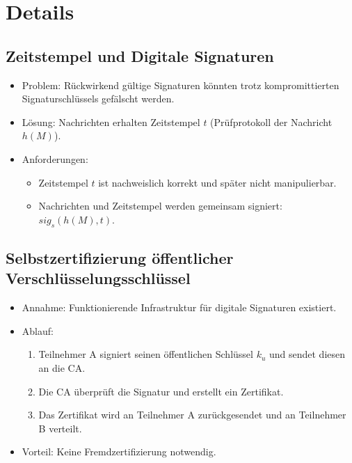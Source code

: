 \documentclass{article}
\begin{document}


\section{Details}

\subsection{Zeitstempel und Digitale Signaturen}
\begin{itemize}
    \item Problem: Rückwirkend gültige Signaturen könnten trotz kompromittierten Signaturschlüssels gefälscht werden.
    \item Lösung: Nachrichten erhalten Zeitstempel $t$ (Prüfprotokoll der Nachricht $h(M)$).
    \item Anforderungen:
    \begin{itemize}
        \item Zeitstempel $t$ ist nachweislich korrekt und später nicht manipulierbar.
        \item Nachrichten und Zeitstempel werden gemeinsam signiert: $sig_s(h(M), t)$.
    \end{itemize}
\end{itemize}

\subsection{Selbstzertifizierung öffentlicher Verschlüsselungsschlüssel}
\begin{itemize}
    \item Annahme: Funktionierende Infrastruktur für digitale Signaturen existiert.
    \item Ablauf:
    \begin{enumerate}
        \item Teilnehmer A signiert seinen öffentlichen Schlüssel $k_u$ und sendet diesen an die CA.
        \item Die CA überprüft die Signatur und erstellt ein Zertifikat.
        \item Das Zertifikat wird an Teilnehmer A zurückgesendet und an Teilnehmer B verteilt.
    \end{enumerate}
    \item Vorteil: Keine Fremdzertifizierung notwendig.
\end{itemize}
\end{document}
